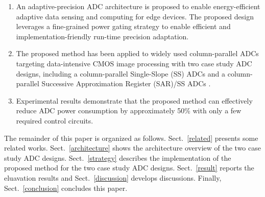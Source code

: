 \begin{enumerate}[\IEEEsetlabelwidth{3)}]
	\item 
	An adaptive-precision ADC architecture is proposed to enable energy-efficient adaptive data sensing and computing for edge devices. The proposed design leverages a fine-grained power gating strategy to enable efficient and implementation-friendly run-time precision adaptation.

	\item 
	The proposed method has been applied to widely used column-parallel ADCs targeting data-intensive CMOS image processing\cite{kim_11-bit_2021,nie_single_2020,kumagai_14-inch_2018,park_640_2020} with two case study ADC designs, including 
	a column-parallel Single-Slope (SS) ADCs \cite{snoeij_18v_2005,kleinfelder_10000_2001} and a column-parallel Successive Approximation Register (SAR)/SS ADCs \cite{kim_area-efficient_2016}. 


	\item 
	Experimental results demonstrate that the proposed method can effectively reduce ADC power consumption by approximately 50\% with only a few required control circuits.

\end{enumerate} 

The remainder of this paper is organized as follows. 
Sect.~\ref{related} presents some related works.
Sect.~\ref{architecture} shows the architecture overview of the two case study ADC designs. 
Sect.~\ref{strategy} describes the implementation of the proposed method for the two case study ADC designs. 
Sect.~\ref{result} reports the eluavation results and Sect.~\ref{discussion} develops discussions. 
Finally, Sect.~\ref{conclusion} concludes this paper.
